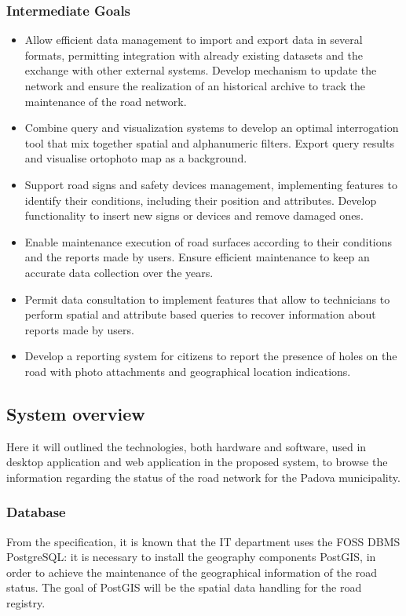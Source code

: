 \subsubsection{Intermediate  Goals}
\begin{itemize}
    \item Allow efficient data management to import and export data in several formats, permitting integration with already existing datasets and the exchange with other external systems. Develop mechanism to update the network and ensure the realization of an historical archive to track the maintenance of the road network.
    \item Combine query and visualization systems to develop an optimal interrogation tool that mix together spatial and alphanumeric filters. Export query results and visualise ortophoto map as a background.
    \item Support road signs and safety devices management, implementing features to identify their conditions, including their position and attributes. Develop functionality to insert new signs or devices and remove damaged ones.
    \item Enable maintenance execution of road surfaces according to their conditions and the reports made by users. Ensure efficient maintenance to keep an accurate data collection over the years.
    \item Permit data consultation to implement features that allow to technicians to perform spatial and attribute based queries to recover information about reports made by users.
    \item Develop a reporting system for citizens to report the presence of holes on the road  with photo attachments and geographical location indications.
    
\end{itemize}

\subsection{System overview}
Here it will outlined the technologies, both hardware and software, used in desktop application and web application in the proposed system, to browse the information regarding the status of the road network for the Padova municipality.

\subsubsection{Database}
From the specification, it is known that the IT department uses the FOSS DBMS PostgreSQL: it is necessary to install the geography components PostGIS, in order to achieve the maintenance of the geographical information of the road status.
The goal of PostGIS will be the spatial data handling for the road registry.

